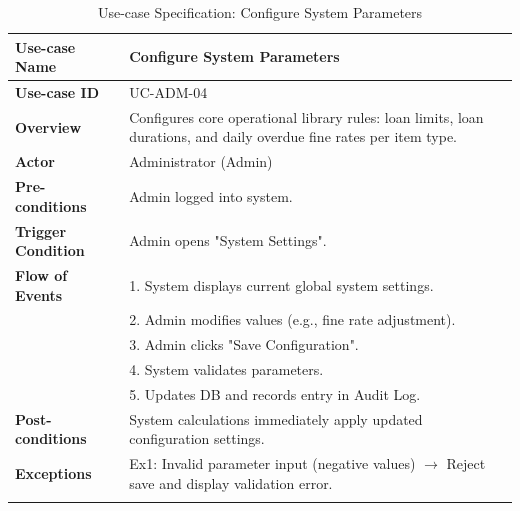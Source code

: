 \begin{longtable}{|p{3.5cm}|p{11.5cm}|}
    \hline
    \textbf{Use-case Name} & \textbf{Configure System Parameters} \\
    \hline
    \textbf{Use-case ID} & UC-ADM-04 \\
    \hline
    \textbf{Overview} & Configures core operational library rules: loan limits, loan durations, and daily overdue fine rates per item type. \\
    \hline
    \textbf{Actor} & Administrator (Admin) \\
    \hline
    \textbf{Pre-conditions} & Admin logged into system. \\
    \hline
    \textbf{Trigger Condition} & Admin opens "System Settings". \\
    \hline
    \textbf{Flow of Events} & 
    1. System displays current global system settings.\\ 
 & 
    2. Admin modifies values (e.g., fine rate adjustment).\\ 
 & 
    3. Admin clicks "Save Configuration".\\ 
 & 
    4. System validates parameters.\\ 
 & 
    5. Updates DB and records entry in Audit Log. \\
    \hline
    \textbf{Post-conditions} & System calculations immediately apply updated configuration settings. \\
    \hline
    \textbf{Exceptions} & 
    Ex1: Invalid parameter input (negative values) $\rightarrow$ Reject save and display validation error. \\
    \hline
    \caption{Use-case Specification: Configure System Parameters} \\
\end{longtable}

